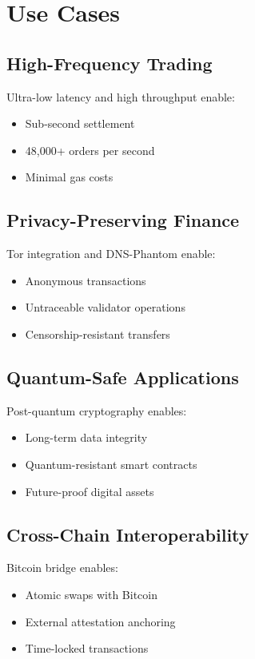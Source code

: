 \documentclass[11pt,a4paper]{article}
\begin{document}
\section{Use Cases}

\subsection{High-Frequency Trading}
Ultra-low latency and high throughput enable:
\begin{itemize}
    \item Sub-second settlement
    \item 48,000+ orders per second
    \item Minimal gas costs
\end{itemize}

\subsection{Privacy-Preserving Finance}
Tor integration and DNS-Phantom enable:
\begin{itemize}
    \item Anonymous transactions
    \item Untraceable validator operations
    \item Censorship-resistant transfers
\end{itemize}

\subsection{Quantum-Safe Applications}
Post-quantum cryptography enables:
\begin{itemize}
    \item Long-term data integrity
    \item Quantum-resistant smart contracts
    \item Future-proof digital assets
\end{itemize}

\subsection{Cross-Chain Interoperability}
Bitcoin bridge enables:
\begin{itemize}
    \item Atomic swaps with Bitcoin
    \item External attestation anchoring
    \item Time-locked transactions
\end{itemize}
\end{document}
